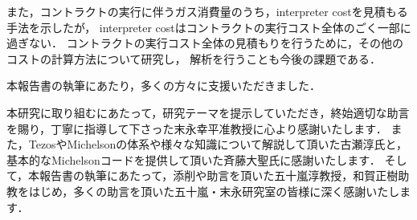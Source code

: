 \documentclass{kuisthesis}
\begin{document}
また，コントラクトの実行に伴うガス消費量のうち，interpreter costを見積もる手法を示したが，
interpreter costはコントラクトの実行コスト全体のごく一部に過ぎない．
コントラクトの実行コスト全体の見積もりを行うために，その他のコストの計算方法について研究し，
解析を行うことも今後の課題である．


\acknowledgments
本報告書の執筆にあたり，多くの方々に支援いただきました．

本研究に取り組むにあたって，研究テーマを提示していただき，終始適切な助言を賜り，丁寧に指導して下さった末永幸平准教授に心より感謝いたします．
また，TezosやMichelsonの体系や様々な知識について解説して頂いた古瀬淳氏と，基本的なMichelsonコードを提供して頂いた斉藤大聖氏に感謝いたします．
そして，本報告書の執筆にあたって，添削や助言を頂いた五十嵐淳教授，和賀正樹助教をはじめ，多くの助言を頂いた五十嵐・末永研究室の皆様に深く感謝いたします．

\nocite{*}


\end{document}
